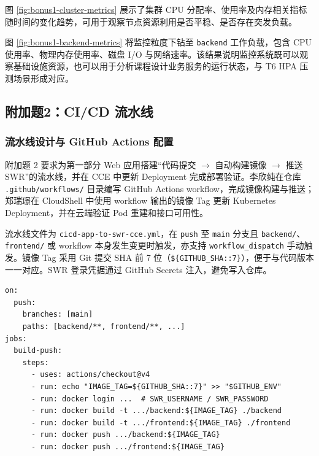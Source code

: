 图 \ref{fig:bonus1-cluster-metrics} 展示了集群 CPU 分配率、使用率及内存相关指标随时间的变化趋势，可用于观察节点资源利用是否平稳、是否存在突发负载。


图 \ref{fig:bonus1-backend-metrics} 将监控粒度下钻至 \verb|backend| 工作负载，包含 CPU 使用率、物理内存使用率、磁盘 I/O 与网络速率。该结果说明监控系统既可以观察基础设施资源，也可以用于分析课程设计业务服务的运行状态，与 T6 HPA 压测场景形成对应。

\subsection{附加题2：CI/CD 流水线}

\subsubsection{流水线设计与 GitHub Actions 配置}

附加题 2 要求为第一部分 Web 应用搭建“代码提交 $\rightarrow$ 自动构建镜像 $\rightarrow$ 推送 SWR”的流水线，并在 CCE 中更新 Deployment 完成部署验证。李欣纯在仓库 \verb|.github/workflows/| 目录编写 GitHub Actions workflow，完成镜像构建与推送；郑瑞璟在 CloudShell 中使用 workflow 输出的镜像 Tag 更新 Kubernetes Deployment，并在云端验证 Pod 重建和接口可用性。

流水线文件为 \verb|cicd-app-to-swr-cce.yml|，在 \verb|push| 至 \verb|main| 分支且 \verb|backend/|、\verb|frontend/| 或 workflow 本身发生变更时触发，亦支持 \verb|workflow_dispatch| 手动触发。镜像 Tag 采用 Git 提交 SHA 前 7 位（\verb|${GITHUB_SHA::7}|），便于与代码版本一一对应。SWR 登录凭据通过 GitHub Secrets 注入，避免写入仓库。

\begin{lstlisting}[caption={CI/CD workflow 核心阶段（节选）}, label=lst:cicd-workflow]
on:
  push:
    branches: [main]
    paths: [backend/**, frontend/**, ...]
jobs:
  build-push:
    steps:
      - uses: actions/checkout@v4
      - run: echo "IMAGE_TAG=${GITHUB_SHA::7}" >> "$GITHUB_ENV"
      - run: docker login ...  # SWR_USERNAME / SWR_PASSWORD
      - run: docker build -t .../backend:${IMAGE_TAG} ./backend
      - run: docker build -t .../frontend:${IMAGE_TAG} ./frontend
      - run: docker push .../backend:${IMAGE_TAG}
      - run: docker push .../frontend:${IMAGE_TAG}
\end{lstlisting}

